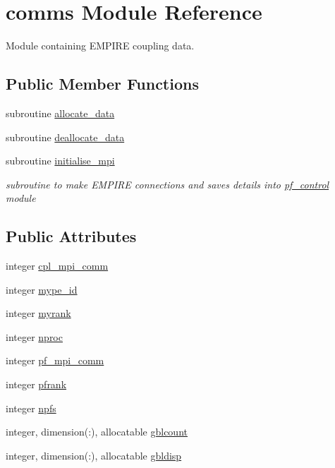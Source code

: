 \hypertarget{classcomms}{\section{comms Module Reference}
\label{classcomms}
}


Module containing E\-M\-P\-I\-R\-E coupling data.  


\subsection*{Public Member Functions}
\begin{DoxyCompactItemize}
\item 
subroutine \hyperlink{classcomms_a61882a03f2b5466163433dd5a3e9e70a}{allocate\-\_\-data}
\item 
subroutine \hyperlink{classcomms_a8841f5445320e65d24a508fa42f10663}{deallocate\-\_\-data}
\item 
subroutine \hyperlink{classcomms_abb286c62a1743d0da16dc3f0495eb501}{initialise\-\_\-mpi}
\begin{DoxyCompactList}\small\item\em subroutine to make E\-M\-P\-I\-R\-E connections and saves details into \hyperlink{classpf__control}{pf\-\_\-control} module \end{DoxyCompactList}\end{DoxyCompactItemize}
\subsection*{Public Attributes}
\begin{DoxyCompactItemize}
\item 
integer \hyperlink{classcomms_a9a38af536275f02674f67d814566ef67}{cpl\-\_\-mpi\-\_\-comm}
\item 
integer \hyperlink{classcomms_adcd9567cc8bd6f78dc184ff3bd433eb8}{mype\-\_\-id}
\item 
integer \hyperlink{classcomms_a0dead85d30852fd43b3667663c98695c}{myrank}
\item 
integer \hyperlink{classcomms_a4d6c1b5d6aa807f60683ccf2cdb89644}{nproc}
\item 
integer \hyperlink{classcomms_a86ca20605ce853814b00dd91fdd0db89}{pf\-\_\-mpi\-\_\-comm}
\item 
integer \hyperlink{classcomms_ac714c7b76943c8057f54dc27bd5575fb}{pfrank}
\item 
integer \hyperlink{classcomms_a0120cad068b402a882222d566d18790e}{npfs}
\item 
integer, dimension(\-:), allocatable \hyperlink{classcomms_a4912d43983e564849625e5588af33348}{gblcount}
\item 
integer, dimension(\-:), allocatable \hyperlink{classcomms_a7b71c5edbea32c7dae3333cb1c05f3fe}{gbldisp}
\end{DoxyCompactItemize}


